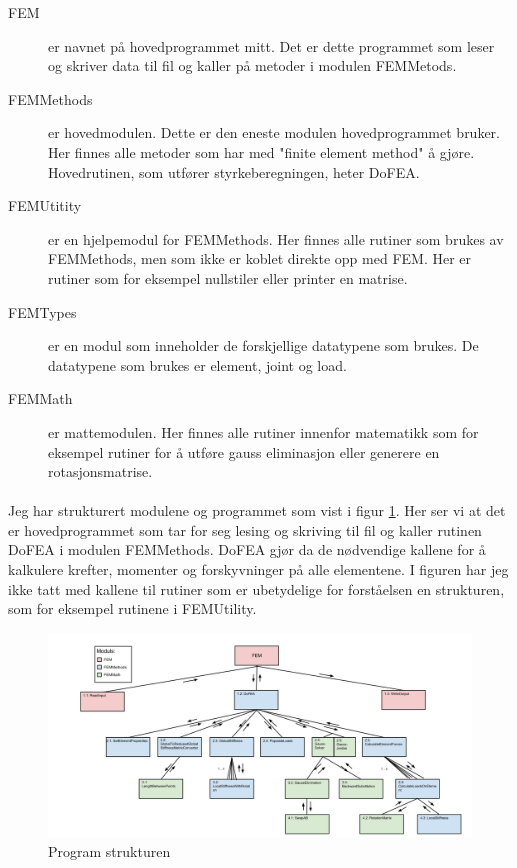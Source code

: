\documentclass[10pt,a4paper, norsk]{article}
\begin{document}
\begin{description}
\item[FEM] er navnet på hovedprogrammet mitt. Det er dette programmet som leser og skriver data til fil og kaller på metoder i modulen FEMMetods.
\item[FEMMethods] er hovedmodulen. Dette er den eneste modulen hovedprogrammet bruker. Her finnes alle metoder som har med "finite element method" å gjøre. Hovedrutinen, som utfører styrkeberegningen, heter DoFEA.
\item[FEMUtitity] er en hjelpemodul for FEMMethods. Her finnes alle rutiner som brukes av FEMMethods, men som ikke er koblet direkte opp med FEM. Her er rutiner som for eksempel nullstiler eller printer en matrise.
\item[FEMTypes] er en modul som inneholder de forskjellige datatypene som brukes. De datatypene som brukes er element, joint og load.
\item[FEMMath] er mattemodulen. Her finnes alle rutiner innenfor matematikk som for eksempel rutiner for å utføre gauss eliminasjon eller generere en rotasjonsmatrise.
\end{description}

\paragraph*{}
Jeg har strukturert modulene og programmet som vist i figur \ref{fig:struktur}. Her ser vi at det er hovedprogrammet som tar for seg lesing og skriving til fil og kaller rutinen DoFEA i modulen FEMMethods. DoFEA gjør da de nødvendige kallene for å kalkulere krefter, momenter og forskyvninger på alle elementene. I figuren har jeg ikke tatt med kallene til rutiner som er ubetydelige for forståelsen en strukturen, som for eksempel rutinene i FEMUtility. 

\begin{figure}[h]
\centering
\includegraphics[scale=0.31]{FEMAStructure.png} 
\caption{Program strukturen}
\label{fig:struktur}
\end{figure}
\end{document}
